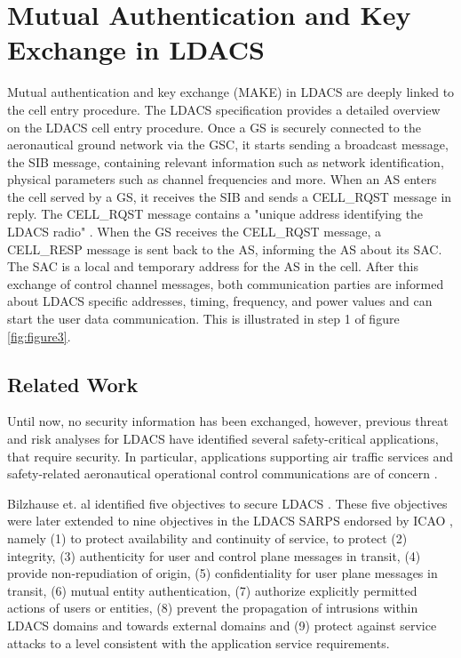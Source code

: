 \section{Mutual Authentication and Key Exchange in LDACS}
\label{Method_ldacs}

\label{ldacscellentry}

Mutual authentication and key exchange (MAKE) in LDACS are deeply linked to the cell entry procedure.
The \ac{LDACS} specification \cite{graeupl2019} provides a detailed overview on the \ac{LDACS} cell entry procedure. Once a \ac{GS} is securely connected to the aeronautical ground network via the \ac{GSC}, it starts sending a broadcast message, the \ac{SIB} message, containing relevant information such as network identification, physical parameters such as channel frequencies and more. When an \ac{AS} enters the cell served by a \ac{GS}, it receives the \ac{SIB} and sends a CELL\_RQST message in reply. The CELL\_RQST message contains a "unique address identifying the \ac{LDACS} radio" \cite{graeupl2019}. When the \ac{GS} receives the CELL\_RQST message, a CELL\_RESP message is sent back to the \ac{AS}, informing the \ac{AS} about its \ac{SAC}. The \ac{SAC} is a local and temporary address for the \ac{AS} in the cell. After this exchange of control channel messages, both communication parties are informed about \ac{LDACS} specific addresses, timing, frequency, and power values and can start the user data communication. This is illustrated in step 1 of figure \ref{fig:figure3}.


\subsection{Related Work}
Until now, no security information has been exchanged, however, previous threat and risk analyses \cite{zelkin2011, maeurer20181, maeurer20191} for LDACS have identified several safety-critical applications, that require security. In particular, applications supporting air traffic services and safety-related aeronautical operational control communications are of concern \cite{maeurer20182, maeurer20192}. 

Bilzhause et. al identified five objectives to secure LDACS \cite{bilzhause2017}. These five objectives were later extended to nine objectives in the \ac{LDACS} \ac{SARPS} endorsed by \ac{ICAO} \cite{icao2018}, namely (1) to protect availability and continuity of service, to protect (2) integrity, (3) authenticity for user and control plane messages in transit, (4) provide non-repudiation of origin, (5) confidentiality for user plane messages in transit, (6) mutual entity authentication, (7) authorize explicitly permitted actions of users or entities, (8) prevent the propagation of intrusions within LDACS domains and towards external domains and (9) protect against service attacks to a level consistent with the application service requirements.

